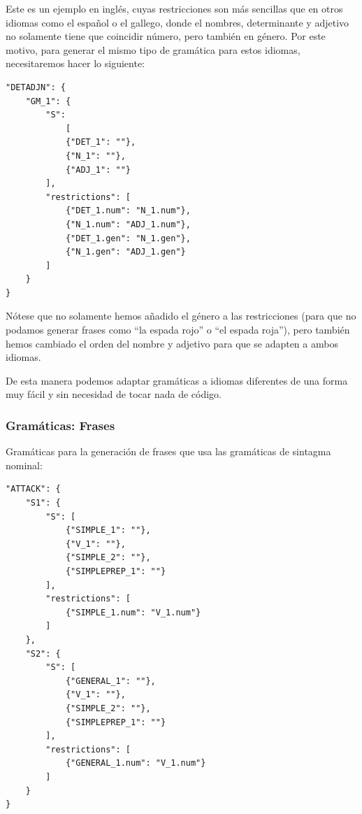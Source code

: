 Este es un ejemplo en inglés, cuyas restricciones son más sencillas que en otros idiomas como el español o el gallego, donde el nombres, determinante y adjetivo no solamente tiene que coincidir número, pero también en género. Por este motivo, para generar el mismo tipo de gramática para estos idiomas, necesitaremos hacer lo siguiente:

\begin{lstlisting}[style=json]
"DETADJN": {
    "GM_1": {
        "S": 
            [
            {"DET_1": ""},
            {"N_1": ""},
            {"ADJ_1": ""}
        ],
        "restrictions": [
            {"DET_1.num": "N_1.num"},
            {"N_1.num": "ADJ_1.num"},
            {"DET_1.gen": "N_1.gen"},
            {"N_1.gen": "ADJ_1.gen"}
        ]
    }
}
\end{lstlisting}

Nótese que no solamente hemos añadido el género a las restricciones (para que no podamos generar frases como ``la espada rojo'' o ``el espada roja''), pero también hemos cambiado el orden del nombre y adjetivo para que se adapten a ambos idiomas. 

De esta manera podemos adaptar gramáticas a idiomas diferentes de una forma muy fácil y sin necesidad de tocar nada de código.

\subsubsection{Gramáticas: Frases}

Gramáticas para la generación de frases que usa las gramáticas de sintagma nominal: 

\begin{lstlisting}[style=json]
"ATTACK": {
	"S1": {
	    "S": [
	        {"SIMPLE_1": ""},
	        {"V_1": ""},
	        {"SIMPLE_2": ""},
	        {"SIMPLEPREP_1": ""}
	    ],
	    "restrictions": [
	        {"SIMPLE_1.num": "V_1.num"}
	    ]
	},
	"S2": {
	    "S": [
	        {"GENERAL_1": ""},
	        {"V_1": ""},
	        {"SIMPLE_2": ""},
	        {"SIMPLEPREP_1": ""}
	    ],
	    "restrictions": [
	        {"GENERAL_1.num": "V_1.num"}
	    ]
	}
}
\end{lstlisting}